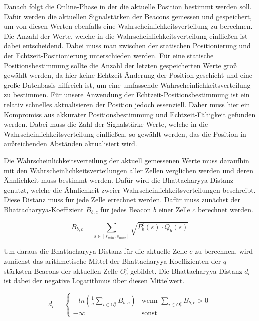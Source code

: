 Danach folgt die Online-Phase in der die aktuelle Position bestimmt werden soll. Dafür werden die aktuellen Signalstärken der Beacons gemessen und gespeichert, um von diesen Werten ebenfalls eine Wahrscheinlichkeitsverteilung zu berechnen. Die Anzahl der Werte, welche in die Wahrscheinlichkeitsverteilung einfließen ist dabei entscheidend.
Dabei muss man zwischen der statischen Positionierung und der Echtzeit-Positionierung unterschieden werden.
Für eine statische Positionsbestimmung sollte die Anzahl der letzten gespeicherten Werte groß gewählt werden, da hier keine Echtzeit-Änderung der Position geschieht und eine große Datenbasis hilfreich ist, um eine umfassende Wahrscheinlichkeitsverteilung zu bestimmen.
Für unsere Anwendung der Echtzeit-Positionsbestimmung ist ein relativ schnelles aktualisieren der Position jedoch essenziell. Daher muss hier ein Kompromiss aus akkurater Positionsbestimmung und Echtzeit-Fähigkeit gefunden werden. Dabei muss die Zahl der Signalstärke-Werte, welche in die Wahrscheinlichkeitsverteilung einfließen, so gewählt werden, das die Position in außreichenden Abständen aktualisiert wird.

Die Wahrscheinlichkeitsverteilung der aktuell gemessenen Werte muss daraufhin mit den Wahrscheinlichkeitsverteilungen aller Zellen verglichen werden und deren Ähnlichkeit muss bestimmt werden. Dafür wird die Bhattacharyya-Distanz genutzt, welche die Ähnlichkeit zweier Wahrscheinlichkeitsverteilungen beschreibt. 
Diese Distanz muss für jede Zelle errechnet werden. 
Dafür muss zunächst der Bhattacharyya-Koeffizient $B_{b, c}$ für jedes Beacon $b$ einer Zelle $c$ berechnet werden.

\begin{equation}
	B_{b, c} = \sum_{s \in [s_{min},s_{max}]} \sqrt{P_{b}^{c}(s) \cdot Q_{b}(s)}
\end{equation}

Um daraus die Bhattacharyya-Distanz für die aktuelle Zelle $c$ zu berechnen, wird zunächst das arithmetische Mittel der Bhattacharyya-Koeffizienten der $q$ stärksten Beacons der aktuellen Zelle $O_{c}^{q}$ gebildet. Die Bhattacharyya-Distanz $d_{c}$ ist dabei der negative Logarithmus über diesen Mittelwert.

\begin{equation}
	d_{c}= \begin{cases}
	-ln (\frac{1}{q} \sum_{i \in O_{c}^{q}} B_{b, c}) & \text{wenn } \sum_{i \in O_{c}^{q}} B_{b, c} > 0 \\
	- \infty & \text{sonst}
	\end{cases}
\end{equation}

